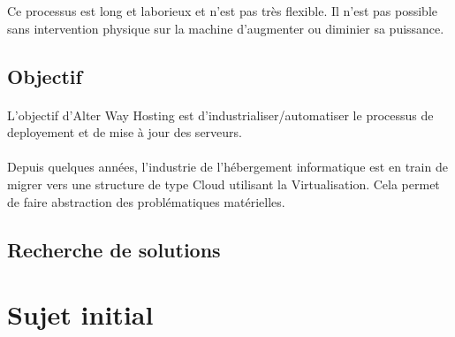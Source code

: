 Ce processus est long et laborieux et n'est pas très flexible. Il n'est pas possible sans intervention physique sur la machine d'augmenter ou diminier sa puissance.

\subsection{Objectif}
\paragraph*{}
L'objectif d'Alter Way Hosting est d'industrialiser/automatiser le processus de deployement et de mise à jour des serveurs.

\paragraph*{}
Depuis quelques années, l'industrie de l'hébergement informatique est en train de migrer vers une structure de type Cloud utilisant la Virtualisation.
Cela permet de faire abstraction des problématiques matérielles.

\subsection{Recherche de solutions}
\paragraph*{}
\lipsum[1]

\section{Sujet initial}
\paragraph*{}
\lipsum[1]



